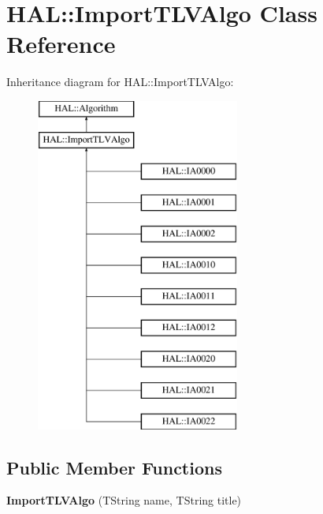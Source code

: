 \hypertarget{class_h_a_l_1_1_import_t_l_v_algo}{\section{H\-A\-L\-:\-:Import\-T\-L\-V\-Algo Class Reference}
\label{class_h_a_l_1_1_import_t_l_v_algo}
}
Inheritance diagram for H\-A\-L\-:\-:Import\-T\-L\-V\-Algo\-:\begin{figure}[H]
\begin{center}
\leavevmode
\includegraphics[height=11.000000cm]{class_h_a_l_1_1_import_t_l_v_algo}
\end{center}
\end{figure}
\subsection*{Public Member Functions}
\begin{DoxyCompactItemize}
\item 
\hypertarget{class_h_a_l_1_1_import_t_l_v_algo_a322b47d4ec39ca216268068b72e7446d}{{\bfseries Import\-T\-L\-V\-Algo} (T\-String name, T\-String title)}\label{class_h_a_l_1_1_import_t_l_v_algo_a322b47d4ec39ca216268068b72e7446d}

\end{DoxyCompactItemize}
